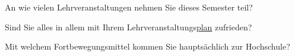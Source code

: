 %
%
%



\separate

\begin{choicequestion}[6]{An wie vielen Lehrveranstaltungen nehmen Sie dieses Semester teil?}
\end{choicequestion}

\separate

\begin{choicequestion}[1]{Sind Sie alles in allem mit Ihrem Lehrveranstaltungs\underline{plan} zufrieden?}
\end{choicequestion}

\separate

\begin{choicequestion}[1]{Mit welchem Fortbewegungsmittel kommen Sie hauptsächlich zur Hochschule?}
\end{choicequestion}
